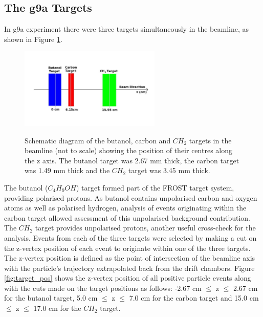 \subsection{The g9a Targets}
In g9a experiment there were three targets simultaneously in the beamline, as shown in Figure \ref{fig:target_draw}.
\begin{figure}[htb]
  \begin{center}
    \includegraphics[width=0.6\textwidth]{figures/targets_drawing.png} \\
    \caption{Schematic diagram of the butanol, carbon and $CH_2$ targets in the beamline (not to scale) showing the position of their centres along the z axis. The butanol target was 2.67 mm thick, the carbon target was 1.49 mm thick and the $CH_2$ target was 3.45 mm thick. }
    \label{fig:target_draw}
    \end{center}
  \end{figure}
The butanol ($C_4 H_9OH$) target formed part of the FROST target system,  providing polarised protons. As butanol contains unpolarised carbon and oxygen atoms as well as polarised hydrogen, analysis of events originating within the carbon target allowed assessment of this unpolarised background contribution. The $CH_2$ target provides unpolarised protons, another useful cross-check for the analysis. Events from each of the three targets were selected by making a cut on the z-vertex position of each event to originate within one of the three targets. The z-vertex position is defined as the point of intersection of the beamline axis with the particle’s trajectory extrapolated back from the drift chambers. Figure \ref{fig:target_pos} shows the z-vertex position of all positive particle events along with the cuts made on the target positions as follows: -2.67 cm $\leq$ z $\leq$ 2.67 cm for the butanol target, 5.0 cm $\leq$ z $\leq$ 7.0 cm for the carbon target and 15.0 cm $\leq$ z $\leq$ 17.0 cm for the $CH_2$ target.
